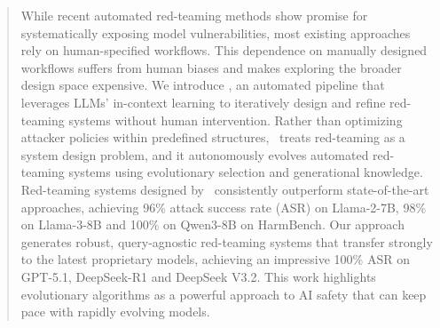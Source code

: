 
\begin{abstract}
While recent automated red-teaming methods show promise for systematically exposing model vulnerabilities, most existing approaches rely on human-specified workflows. This dependence on manually designed workflows suffers from human biases and makes exploring the broader design space expensive. We introduce \method, an automated pipeline that leverages LLMs' in-context learning to iteratively design and refine red-teaming systems without human intervention. Rather than optimizing attacker policies within predefined structures, \method~treats red-teaming as a system design problem, and it autonomously evolves automated red-teaming systems using evolutionary selection and generational knowledge. Red-teaming systems designed by \method~consistently outperform state-of-the-art approaches, achieving 96\% attack success rate (ASR) on Llama-2-7B, 98\% on Llama-3-8B and 100\% on Qwen3-8B on HarmBench. Our approach generates robust, query-agnostic red-teaming systems that transfer strongly to the latest proprietary models, achieving an impressive 100\% ASR on GPT-5.1, DeepSeek-R1 and DeepSeek V3.2. This work highlights evolutionary algorithms as a powerful approach to AI safety that can keep pace with rapidly evolving models.
\end{abstract}